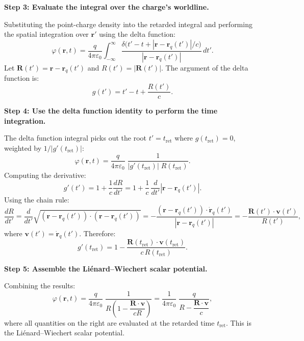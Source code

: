\textbf{Step 3: Evaluate the integral over the charge's worldline.}

Substituting the point-charge density into the retarded integral and performing the spatial integration over $\mathbf{r}'$ using the delta function:
\begin{equation}
\varphi(\mathbf{r},t) = \frac{q}{4\pi\varepsilon_{0}}\int_{-\infty}^{\infty} \frac{\delta\!\bigl(t' - t + |\mathbf{r}-\mathbf{r}_{q}(t')|/c\bigr)}{|\mathbf{r}-\mathbf{r}_{q}(t')|}\,dt'.
\end{equation}
Let $\mathbf{R}(t') = \mathbf{r} - \mathbf{r}_{q}(t')$ and $R(t') = |\mathbf{R}(t')|$. The argument of the delta function is:
\begin{equation}
g(t') = t' - t + \frac{R(t')}{c}.
\end{equation}

\textbf{Step 4: Use the delta function identity to perform the time integration.}

The delta function integral picks out the root $t' = t_{\text{ret}}$ where $g(t_{\text{ret}}) = 0$, weighted by $1/|g'(t_{\text{ret}})|$:
\begin{equation}
\varphi(\mathbf{r},t) = \frac{q}{4\pi\varepsilon_{0}}\;\frac{1}{|g'(t_{\text{ret}})|\;R(t_{\text{ret}})}.
\end{equation}
Computing the derivative:
\begin{equation}
g'(t') = 1 + \frac{1}{c}\frac{dR}{dt'} = 1 + \frac{1}{c}\,\frac{d}{dt'}|\mathbf{r}-\mathbf{r}_{q}(t')|.
\end{equation}
Using the chain rule:
\begin{equation}
\frac{dR}{dt'} = \frac{d}{dt'}\sqrt{(\mathbf{r}-\mathbf{r}_{q}(t'))\cdot(\mathbf{r}-\mathbf{r}_{q}(t'))} = -\frac{(\mathbf{r}-\mathbf{r}_{q}(t'))\cdot\dot{\mathbf{r}}_{q}(t')}{|\mathbf{r}-\mathbf{r}_{q}(t')|} = -\frac{\mathbf{R}(t')\cdot\mathbf{v}(t')}{R(t')},
\end{equation}
where $\mathbf{v}(t') = \dot{\mathbf{r}}_{q}(t')$. Therefore:
\begin{equation}
g'(t_{\text{ret}}) = 1 - \frac{\mathbf{R}(t_{\text{ret}})\cdot\mathbf{v}(t_{\text{ret}})}{c\,R(t_{\text{ret}})}.
\end{equation}

\textbf{Step 5: Assemble the Li\'enard--Wiechert scalar potential.}

Combining the results:
\begin{equation}
\varphi(\mathbf{r},t) = \frac{q}{4\pi\varepsilon_{0}}\;\frac{1}{R\!\left(1 - \dfrac{\mathbf{R}\cdot\mathbf{v}}{cR}\right)} = \frac{1}{4\pi\varepsilon_{0}}\;\frac{q}{R - \dfrac{\mathbf{R}\cdot\mathbf{v}}{c}},
\end{equation}
where all quantities on the right are evaluated at the retarded time $t_{\text{ret}}$. This is the Li\'enard--Wiechert scalar potential.

